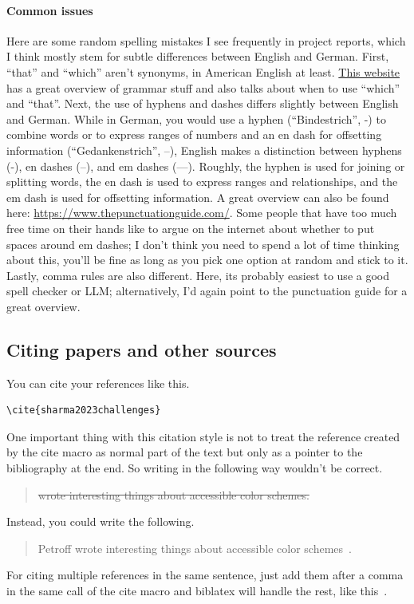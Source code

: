 \documentclass{3s-report}
\begin{document}
    \paragraph{Common issues}
    Here are some random spelling mistakes I see frequently in project reports, which I think mostly stem for subtle differences between English and German.
    First, \enquote{that} and \enquote{which} aren't synonyms, in American English at least.
    \href{https://www.thepunctuationguide.com/comma.html\#:\textasciitilde:text=That\%20and\%20which}{This website} has a great overview of grammar stuff and also talks about when to use \enquote{which} and \enquote{that}.
    Next, the use of hyphens and dashes differs slightly between English and German.
    While in German, you would use a hyphen (\enquote{Bindestrich}, -) to combine words or to express ranges of numbers and an en dash for offsetting information (\enquote{Gedankenstrich}, --), English makes a distinction between hyphens (-), en dashes (--), and em dashes (---).
    Roughly, the hyphen is used for joining or splitting words, the en dash is used to express ranges and relationships, and the em dash is used for offsetting information.
    A great overview can also be found here: \url{https://www.thepunctuationguide.com/}.
    Some people that have too much free time on their hands like to argue on the internet about whether to put spaces around em dashes; I don't think you need to spend a lot of time thinking about this, you'll be fine as long as you pick one option at random and stick to it.
    Lastly, comma rules are also different.
    Here, its probably easiest to use a good spell checker or LLM; alternatively, I'd again point to the punctuation guide for a great overview.

    \subsection{Citing papers and other sources}
    You can cite your references like this.
    \begin{verbatim}
\cite{sharma2023challenges}
    \end{verbatim}
    One important thing with this citation style is not to treat the reference created by the cite macro as normal part of the text but only as a pointer to the bibliography at the end.
    So writing in the following way wouldn't be correct.
    \begin{quote}
        \sout{\cite{petroff2024accessible} wrote interesting things about accessible color schemes.}
    \end{quote}
    Instead, you could write the following.
    \begin{quote}
        Petroff wrote interesting things about accessible color schemes~\cite{petroff2024accessible}.
    \end{quote}
    For citing multiple references in the same sentence, just add them after a comma in the same call of the cite macro and biblatex will handle the rest, like this~\cite{petroff2024accessible,sharma2023challenges}.

    \printbibliography
\end{document}
